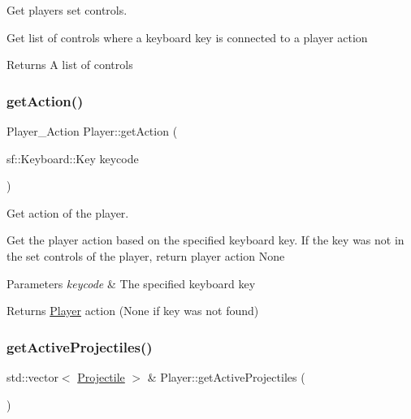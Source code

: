 Get player\textquotesingle{}s set controls. 

Get list of controls where a keyboard key is connected to a player action \begin{DoxyReturn}{Returns}
A list of controls 
\end{DoxyReturn}
\mbox{\label{classPlayer_a7c1ccd08bb0263db78641f4397d5f158}} 
\subsubsection{\texorpdfstring{get\+Action()}{getAction()}}
{\footnotesize\ttfamily Player\+\_\+\+Action Player\+::get\+Action (\begin{DoxyParamCaption}\item[{sf\+::\+Keyboard\+::\+Key}]{keycode }\end{DoxyParamCaption})}



Get action of the player. 

Get the player action based on the specified keyboard key. If the key was not in the set controls of the player, return player action None 
\begin{DoxyParams}{Parameters}
{\em keycode} & The specified keyboard key \\
\hline
\end{DoxyParams}
\begin{DoxyReturn}{Returns}
\hyperlink{classPlayer}{Player} action (None if key was not found) 
\end{DoxyReturn}
\mbox{\label{classPlayer_a0e8dc2d397dc0a6e3634cb32a01ff4cb}} 
\subsubsection{\texorpdfstring{get\+Active\+Projectiles()}{getActiveProjectiles()}\hspace{0.1cm}{\footnotesize\ttfamily [1/2]}}
{\footnotesize\ttfamily std\+::vector$<$ \hyperlink{classProjectile}{Projectile} $>$ \& Player\+::get\+Active\+Projectiles (\begin{DoxyParamCaption}{ }\end{DoxyParamCaption})}




